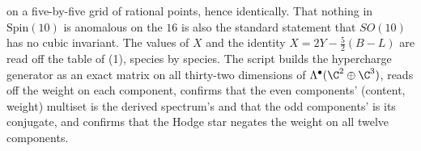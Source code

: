 on a five-by-five grid of rational points, hence identically. That nothing in $\mathrm{Spin}(10)$ is anomalous on the $16$ is also the standard statement that $SO(10)$ has no cubic invariant. The values of $X$ and the identity $X = 2Y - \tfrac52(B - L)$ are read off the table of (1), species by species. The script builds the hypercharge generator as an exact matrix on all thirty-two dimensions of $\Lambda^{\bullet}(\C^{2} \oplus \C^{3})$, reads off the weight on each component, confirms that the even components' (content, weight) multiset is the derived spectrum's and that the odd components' is its conjugate, and confirms that the Hodge star negates the weight on all twelve components.
